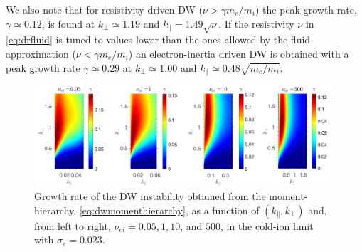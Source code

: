 %
We also note that for resistivity driven DW ($\nu>\gamma m_e/m_i$) the peak growth rate,  $\gamma \simeq 0.12$, is found at $k_\perp \simeq 1.19$ and $k_\parallel = 1.49 \sqrt{\nu}$.
%
If the resistivity $\nu$ in \cref{eq:drfluid} is tuned to values lower than the ones allowed by the fluid approximation ($\nu<\gamma m_e/m_i$) an electron-inertia driven DW is obtained with a peak growth rate $\gamma \simeq 0.29$ at $k_\perp \simeq 1.00$ and $k_\parallel \simeq 0.48 \sqrt{m_e/m_i}$.


\begin{figure}
    \centering
    \includegraphics[width=0.99\textwidth]{images/DW_Scan.pdf}
    \caption{Growth rate of the DW instability obtained from the moment-hierarchy, \cref{eq:dwmomenthierarchy}, as a function of $(k_\parallel, k_\perp)$ and, from left to right, $\nu_{ei} =0.05, 1, 10$, and $500$, in the cold-ion limit with $\sigma_e=0.023$.}
    \label{fig:dwscan}
\end{figure}

